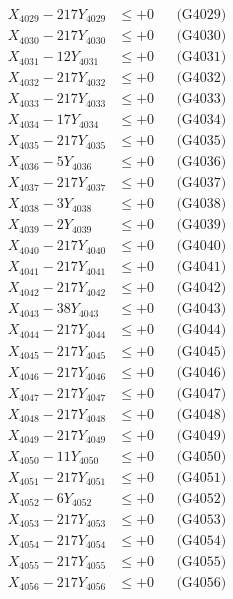 \documentclass[a4paper,10pt]{article}
\begin{document}
{\begin{align}
X_{4029} - 217Y_{4029} &\leq +0 && \text{(G4029)} \\
X_{4030} - 217Y_{4030} &\leq +0 && \text{(G4030)} \\
\allowbreak
X_{4031} - 12Y_{4031} &\leq +0 && \text{(G4031)} \\
X_{4032} - 217Y_{4032} &\leq +0 && \text{(G4032)} \\
X_{4033} - 217Y_{4033} &\leq +0 && \text{(G4033)} \\
X_{4034} - 17Y_{4034} &\leq +0 && \text{(G4034)} \\
X_{4035} - 217Y_{4035} &\leq +0 && \text{(G4035)} \\
X_{4036} - 5Y_{4036} &\leq +0 && \text{(G4036)} \\
X_{4037} - 217Y_{4037} &\leq +0 && \text{(G4037)} \\
X_{4038} - 3Y_{4038} &\leq +0 && \text{(G4038)} \\
X_{4039} - 2Y_{4039} &\leq +0 && \text{(G4039)} \\
X_{4040} - 217Y_{4040} &\leq +0 && \text{(G4040)} \\
\allowbreak
X_{4041} - 217Y_{4041} &\leq +0 && \text{(G4041)} \\
X_{4042} - 217Y_{4042} &\leq +0 && \text{(G4042)} \\
X_{4043} - 38Y_{4043} &\leq +0 && \text{(G4043)} \\
X_{4044} - 217Y_{4044} &\leq +0 && \text{(G4044)} \\
X_{4045} - 217Y_{4045} &\leq +0 && \text{(G4045)} \\
X_{4046} - 217Y_{4046} &\leq +0 && \text{(G4046)} \\
X_{4047} - 217Y_{4047} &\leq +0 && \text{(G4047)} \\
X_{4048} - 217Y_{4048} &\leq +0 && \text{(G4048)} \\
X_{4049} - 217Y_{4049} &\leq +0 && \text{(G4049)} \\
X_{4050} - 11Y_{4050} &\leq +0 && \text{(G4050)} \\
\allowbreak
X_{4051} - 217Y_{4051} &\leq +0 && \text{(G4051)} \\
X_{4052} - 6Y_{4052} &\leq +0 && \text{(G4052)} \\
X_{4053} - 217Y_{4053} &\leq +0 && \text{(G4053)} \\
X_{4054} - 217Y_{4054} &\leq +0 && \text{(G4054)} \\
X_{4055} - 217Y_{4055} &\leq +0 && \text{(G4055)} \\
X_{4056} - 217Y_{4056} &\leq +0 && \text{(G4056)} \\

\end{align}}
\end{document}
